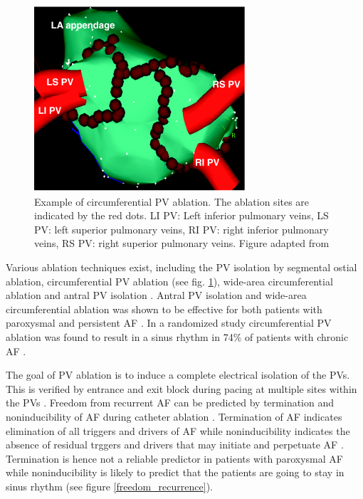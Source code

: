 \vspace*{-0.6cm}
\begin{figure}[H]
\begin{center}
\includegraphics[scale=0.7]{./teile/introduction/ablation_cut.png}
\caption{Example of circumferential PV ablation. The ablation sites are indicated by the red dots. LI PV: Left inferior pulmonary veins, 
LS PV: left superior pulmonary veins, RI PV: right inferior pulmonary veins, RS PV: right superior pulmonary veins. Figure adapted 
from \cite{Ora06}}
\label{af_circ}
\end{center}
\end{figure}

\vspace*{-0.7cm}

Various ablation techniques exist, including the PV isolation by segmental ostial ablation, circumferential PV ablation (see 
fig. \ref{af_circ}), wide-area circumferential ablation and antral PV isolation \cite{Ora06, Ora03, Ouy04}. Antral PV isolation 
and wide-area circumferential ablation was shown to be effective for both patients with paroxysmal and persistent AF \cite{CE09, Ora03}. 
In a randomized study circumferential PV ablation was found to result in a sinus rhythm in 74\% of patients with chronic AF \cite{Ora06}. \newline

\newpage

The goal of PV ablation is to induce a complete electrical isolation of the PVs. This is verified by entrance and exit block during 
pacing at multiple sites within the PVs \cite{CE09}. Freedom from recurrent AF can be predicted by 
termination and noninducibility of AF during catheter ablation \cite{Ora02, Ora06, Hai05, Hai04, Ora04}. Termination 
of AF indicates elimination of all triggers and drivers of AF while noninducibility indicates the absence of residual trggers and drivers 
that may initiate and perpetuate AF \cite{CE09}. Termination is hence not a reliable predictor in patients with paroxysmal AF while 
noninducibility is likely to predict that the patients are going to stay in sinus rhythm (see figure \ref{freedom_recurrence}). 

